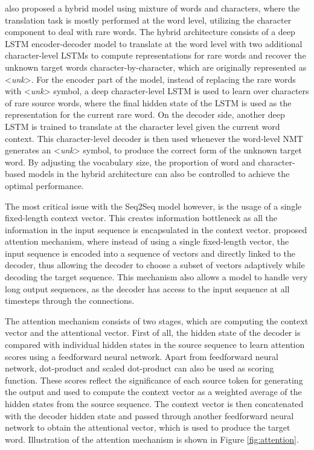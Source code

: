 \documentclass[12pt]{extarticle}
\begin{document}
\newpage
\citep{luong-manning-2016-achieving} also proposed a hybrid model using mixture of words and characters, where the translation task is mostly performed at the word level, utilizing the character component to deal with rare words. The hybrid architecture consists of a deep LSTM encoder-decoder model to translate at the word level with two additional character-level LSTMs to compute representations for rare words and recover the unknown target words character-by-character, which are originally represented as \textless \textit{unk}\textgreater{}. For the encoder part of the model, instead of replacing the rare words with \textless \textit{unk}\textgreater{} symbol, a deep character-level LSTM is used to learn over characters of rare source words, where the final hidden state of the LSTM is used as the representation for the current rare word. On the decoder side, another deep LSTM is trained to translate at the character level given the current word context. This character-level decoder is then used whenever the word-level NMT generates an \textless \textit{unk}\textgreater{} symbol, to produce the correct form of the unknown target word. By adjusting the vocabulary size, the proportion of word and character-based models in the hybrid architecture can also be controlled to achieve the optimal performance.

The most critical issue with the Seq2Seq model however, is the usage of a single fixed-length context vector. This creates information bottleneck as all the information in the input sequence is encapsulated in the context vector. \citep{DBLP:journals/corr/BahdanauCB14} proposed attention mechanism, where instead of using a single fixed-length vector, the input sequence is encoded into a sequence of vectors and directly linked to the decoder, thus allowing the decoder to choose a subset of vectors adaptively while decoding the target sequence. This mechanism also allows a model to handle very long output sequences, as the decoder has access to the input sequence at all timesteps through the connections.

The attention mechanism consists of two stages, which are computing the context vector and the attentional vector. First of all, the hidden state of the decoder is compared with individual hidden states in the source sequence to learn attention scores using a feedforward neural network. Apart from feedforward neural network, dot-product \citep{luong-etal-2015-effective} and scaled dot-product \citep{NIPS2017_7181} can also be used as scoring function. These scores reflect the significance of each source token for generating the output and used to compute the context vector as a weighted average of the hidden states from the source sequence. The context vector is then concatenated with the decoder hidden state and passed through another feedforward neural network to obtain the attentional vector, which is used to produce the target word. Illustration of the attention mechanism is shown in Figure \ref{fig:attention}.
\end{document}
